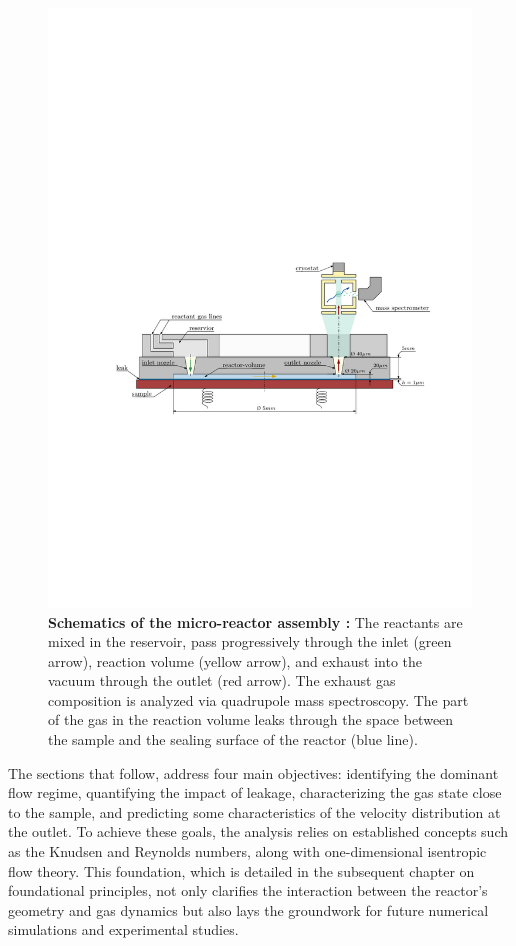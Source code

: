 	\begin{figure}[H]
	    \centering
	    \includegraphics[width=\textwidth]{src/01_scope-and-objectives/fig_technical-drawing.pdf}
	    \caption[Schematics of the micro-reactor assembly \cite{lagin2025poster}:]{
			\textbf{Schematics of the micro-reactor assembly \cite{lagin2025poster}:} The reactants are mixed in the reservoir, pass progressively through the inlet (green arrow), reaction volume (yellow arrow), and exhaust into the vacuum through the outlet (red arrow).
			The exhaust gas composition is analyzed via quadrupole mass spectroscopy.
			The part of the gas in the reaction volume leaks through the space between the sample and the sealing surface of the reactor (blue line).
			}
	    \label{fig:technical-drawing}
	\end{figure}

	The sections that follow, address four main objectives: identifying the dominant flow regime, quantifying the impact of leakage, characterizing the gas state close to the sample, and predicting some characteristics of the velocity distribution at the outlet.
	To achieve these goals, the analysis relies on established concepts such as the Knudsen and Reynolds numbers, along with one-dimensional isentropic flow theory.
	This foundation, which is detailed in the subsequent chapter on foundational principles, not only clarifies the interaction between the reactor’s geometry and gas dynamics but also lays the groundwork for future numerical simulations and experimental studies.	

